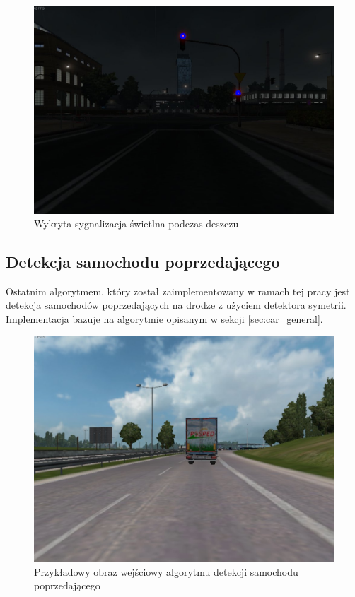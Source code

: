 \begin{figure}
  \centering
  \includegraphics[width=13cm]{img/alg2_rain.jpg}
  \caption{Wykryta sygnalizacja świetlna podczas deszczu}
  \label{fig:alg2_rain}
\end{figure}

\subsection{Detekcja samochodu poprzedającego}
Ostatnim algorytmem, który został zaimplementowany w ramach tej pracy jest detekcja samochodów poprzedających na drodze z użyciem detektora symetrii. Implementacja bazuje na algorytmie opisanym w sekcji \ref{sec:car_general}.

\begin{figure}
  \centering
  \includegraphics[width=13cm]{img/alg3_input.jpg}
  \caption{Przykładowy obraz wejściowy algorytmu detekcji samochodu poprzedającego}
  \label{fig:alg3_input}
\end{figure}


